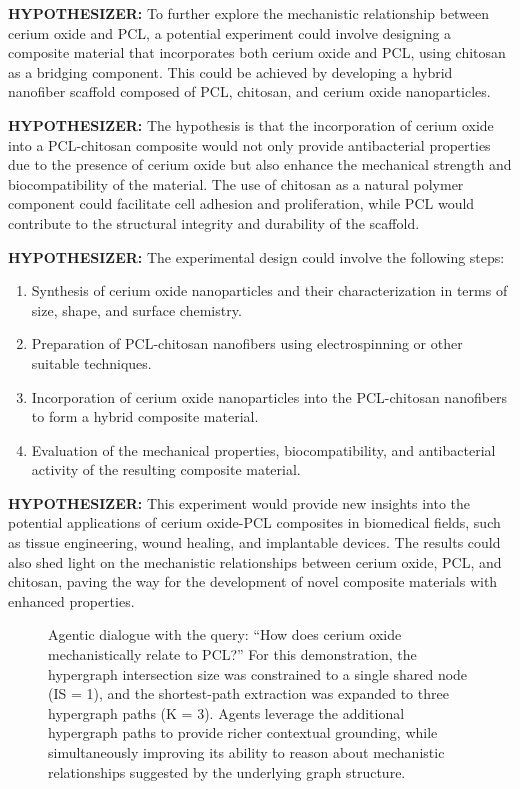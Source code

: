\documentclass{article}
\begin{document}
\begin{leftbubbles}
\textbf{HYPOTHESIZER: } To further explore the mechanistic relationship between cerium oxide and PCL, a potential experiment could involve designing a composite material that incorporates both cerium oxide and PCL, using chitosan as a bridging component. This could be achieved by developing a hybrid nanofiber scaffold composed of PCL, chitosan, and cerium oxide nanoparticles.

\textbf{HYPOTHESIZER:} The hypothesis is that the incorporation of cerium oxide into a PCL-chitosan composite would not only provide antibacterial properties due to the presence of cerium oxide but also enhance the mechanical strength and biocompatibility of the material. The use of chitosan as a natural polymer component could facilitate cell adhesion and proliferation, while PCL would contribute to the structural integrity and durability of the scaffold.

\textbf{HYPOTHESIZER:} The experimental design could involve the following steps:
\begin{enumerate}
    \item Synthesis of cerium oxide nanoparticles and their characterization in terms of size, shape, and surface chemistry.
    \item Preparation of PCL-chitosan nanofibers using electrospinning or other suitable techniques.
    \item Incorporation of cerium oxide nanoparticles into the PCL-chitosan nanofibers to form a hybrid composite material.
    \item Evaluation of the mechanical properties, biocompatibility, and antibacterial activity of the resulting composite material.
\end{enumerate}

\textbf{HYPOTHESIZER:} This experiment would provide new insights into the potential applications of cerium oxide-PCL composites in biomedical fields, such as tissue engineering, wound healing, and implantable devices. The results could also shed light on the mechanistic relationships between cerium oxide, PCL, and chitosan, paving the way for the development of novel composite materials with enhanced properties.
\end{leftbubbles}

\begin{figure}[htbp]
\centering
\small
\caption{Agentic dialogue with the query: “How does cerium oxide mechanistically relate to PCL?” For this demonstration, the hypergraph intersection size was constrained to a single shared node (IS = 1), and the shortest-path extraction was expanded to three hypergraph paths (K = 3). Agents leverage the additional hypergraph paths to provide richer contextual grounding, while simultaneously improving its ability to reason about mechanistic relationships suggested by the underlying graph structure.}
\label{fig:Yen3}
\end{figure}
\end{document}
